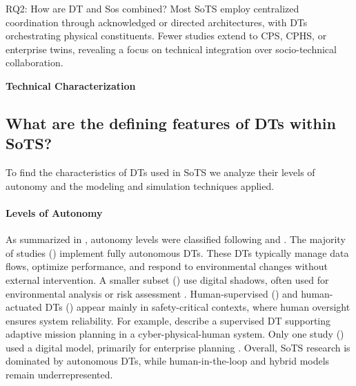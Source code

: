 \vspace{1em}
\begin{conclusionframe}{RQ2: How are DT and Sos combined?}
Most SoTS employ centralized coordination through acknowledged or directed architectures, with DTs orchestrating physical constituents. Fewer studies extend to CPS, CPHS, or enterprise twins, revealing a focus on technical integration over socio-technical collaboration.
\end{conclusionframe}



\vspace{0.5em}
\noindent \textbf{\large Technical Characterization}
\vspace{-1em}


\subsection{What are the defining features of DTs within SoTS?}\label{subsec:literature-review-results-rq3}
To find the characteristics of DTs used in SoTS we analyze their levels of autonomy and the modeling and simulation techniques applied.

% 


\paragraph{Levels of Autonomy}\label{para:lt-rq3-autonomy-levels}
As summarized in , autonomy levels were classified following \citet{kritzinger2018digital} and \citet{david2024infonomics}. The majority of studies () implement fully autonomous DTs. These DTs typically manage data flows, optimize performance, and respond to environmental changes without external intervention. A smaller subset () use digital shadows, often used for environmental analysis or risk assessment \cite{hofmeister2024semantic}. Human-supervised () and human-actuated DTs () appear mainly in safety-critical contexts, where human oversight ensures system reliability. For example, \citet{folds2019digital} describe a supervised DT supporting adaptive mission planning in a cyber-physical-human system. Only one study () used a digital model, primarily for enterprise planning \cite{kulkarni2019towards}. Overall, SoTS research is dominated by autonomous DTs, while human-in-the-loop and hybrid models remain underrepresented.

